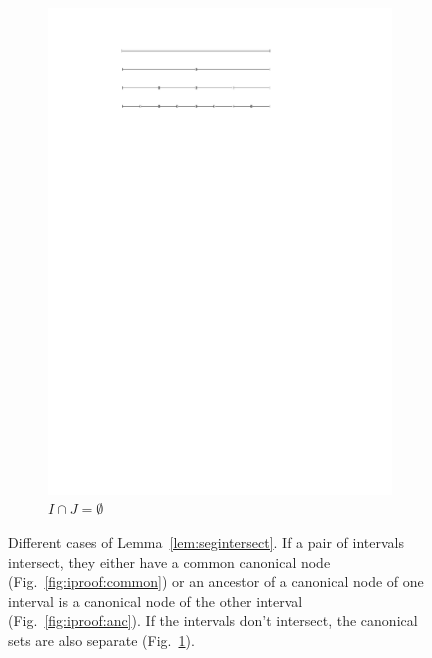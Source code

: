 \documentclass[english,gradu]{tktltiki2018}
\begin{document}
\begin{figure}
\begin{subfigure}[t]{0.32\textwidth}
		\includegraphics[width=\textwidth,page=2]{fig/iproof}
		\caption{$I\cap J=\emptyset$}\label{fig:iproof:no}
	\end{subfigure}
	\caption{Different cases of Lemma~\ref{lem:segintersect}.
	If a pair of intervals intersect, they either have a common canonical node (Fig.~\ref{fig:iproof:common}) or an ancestor of a canonical node of one interval is a canonical node of the other interval (Fig.~\ref{fig:iproof:anc}).
	If the intervals don't intersect, the canonical sets are also separate (Fig.~\ref{fig:iproof:no}).}\label{fig:iproof}
\end{figure}
\end{document}
